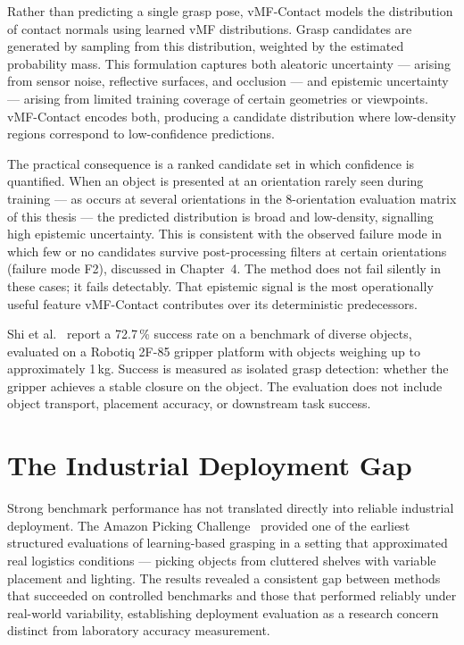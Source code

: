 \documentclass[12pt, a4paper]{report}
\begin{document}
Rather than predicting a single grasp pose, vMF-Contact models the distribution of contact normals using learned vMF distributions. Grasp candidates are generated by sampling from this distribution, weighted by the estimated probability mass. This formulation captures both aleatoric uncertainty --- arising from sensor noise, reflective surfaces, and occlusion --- and epistemic uncertainty --- arising from limited training coverage of certain geometries or viewpoints. vMF-Contact encodes both, producing a candidate distribution where low-density regions correspond to low-confidence predictions.

The practical consequence is a ranked candidate set in which confidence is quantified. When an object is presented at an orientation rarely seen during training --- as occurs at several orientations in the 8-orientation evaluation matrix of this thesis --- the predicted distribution is broad and low-density, signalling high epistemic uncertainty. This is consistent with the observed failure mode in which few or no candidates survive post-processing filters at certain orientations (failure mode F2), discussed in Chapter~4. The method does not fail silently in these cases; it fails detectably. That epistemic signal is the most operationally useful feature vMF-Contact contributes over its deterministic predecessors.

Shi et al.~\cite{shi2025} report a 72.7\,\% success rate on a benchmark of diverse objects, evaluated on a Robotiq 2F-85 gripper platform with objects weighing up to approximately 1\,kg. Success is measured as isolated grasp detection: whether the gripper achieves a stable closure on the object. The evaluation does not include object transport, placement accuracy, or downstream task success.

\section{The Industrial Deployment Gap}
\label{sec:industrial-deployment-gap}

Strong benchmark performance has not translated directly into reliable industrial deployment. The Amazon Picking Challenge~\cite{correll2016analysis} provided one of the earliest structured evaluations of learning-based grasping in a setting that approximated real logistics conditions --- picking objects from cluttered shelves with variable placement and lighting. The results revealed a consistent gap between methods that succeeded on controlled benchmarks and those that performed reliably under real-world variability, establishing deployment evaluation as a research concern distinct from laboratory accuracy measurement.
\end{document}
